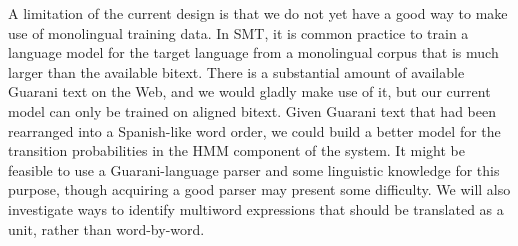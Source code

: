 \documentclass[11pt]{article}
\begin{document}
A limitation of the current design is that we do not yet have a good way to
make use of monolingual training data. In SMT, it is common practice to train a
language model for the target language from a monolingual corpus that is much
larger than the available bitext. There is a substantial amount of available
Guarani text on the Web, and we would gladly make use of it, but our current
model can only be trained on aligned bitext.  Given Guarani text that had been
rearranged into a Spanish-like word order, we could build a better model for
the transition probabilities in the HMM component of the system. It might be
feasible to use a Guarani-language parser and some linguistic knowledge for
this purpose, though acquiring a good parser may present some difficulty.
We will also investigate ways to identify multiword expressions that should be
translated as a unit, rather than word-by-word.


{}
\end{document}
